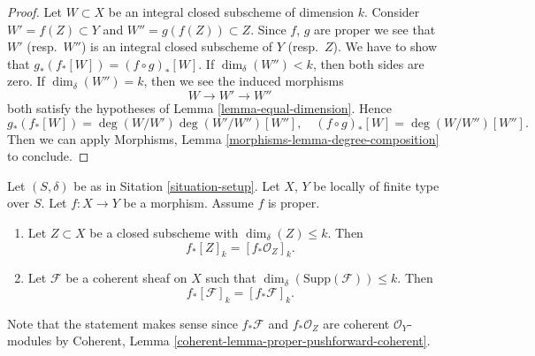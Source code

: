 \begin{proof}
Let $W \subset X$ be an integral closed subscheme of dimension $k$.
Consider $W' = f(Z) \subset Y$ and $W'' = g(f(Z)) \subset Z$.
Since $f$, $g$ are proper we see that $W'$ (resp.\ $W''$) is
an integral closed subscheme of $Y$ (resp.\ $Z$).
We have to show that $g_*(f_*[W]) = (f \circ g)_*[W]$.
If $\dim_\delta(W'') < k$, then both sides are zero.
If $\dim_\delta(W'') = k$, then we see the induced morphisms
$$
W \longrightarrow
W' \longrightarrow
W''
$$
both satisfy the hypotheses of Lemma \ref{lemma-equal-dimension}. Hence
$$
g_*(f_*[W]) = \deg(W/W')\deg(W'/W'')[W''],
\quad
(f \circ g)_*[W] = \deg(W/W'')[W''].
$$
Then we can apply
Morphisms, Lemma \ref{morphisms-lemma-degree-composition}
to conclude.
\end{proof}

\begin{lemma}
\label{lemma-cycle-push-sheaf}
Let $(S, \delta)$ be as in Sitation \ref{situation-setup}.
Let $X$, $Y$ be locally of finite type over $S$.
Let $f : X \to Y$ be a morphism.
Assume $f$ is proper.
\begin{enumerate}
\item Let $Z \subset X$ be a closed subscheme with $\dim_\delta(Z) \leq k$.
Then
$$
f_*[Z]_k = [f_*{\mathcal O}_Z]_k.
$$
\item Let $\mathcal{F}$ be a coherent sheaf on $X$ such that
$\dim_\delta(\text{Supp}(\mathcal{F})) \leq k$. Then
$$
f_*[\mathcal{F}]_k = [f_*{\mathcal F}]_k.
$$
\end{enumerate}
Note that the statement makes sense since $f_*\mathcal{F}$ and
$f_*\mathcal{O}_Z$ are coherent $\mathcal{O}_Y$-modules by
Coherent, Lemma \ref{coherent-lemma-proper-pushforward-coherent}.
\end{lemma}

